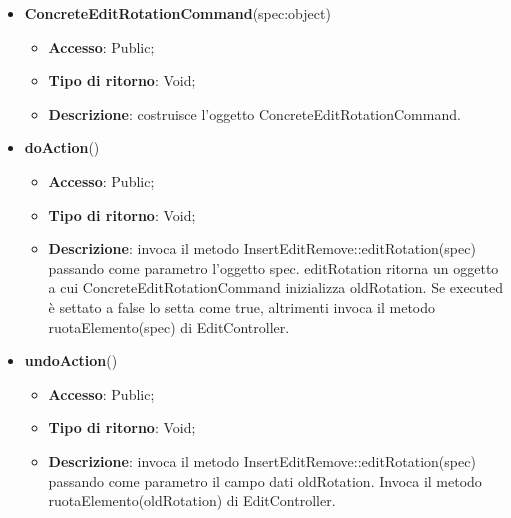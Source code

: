 {{{\begin{itemize}
\begin{itemize}
\begin{itemize}
\begin{itemize}
			\end{itemize}
		\end{itemize}
			\end{itemize}
			\end{itemize}
		\begin{itemize}
			\item \textbf{ConcreteEditRotationCommand}(spec:object)
			\begin{itemize}
				\item \textbf{Accesso}: Public;
				\item \textbf{Tipo di ritorno}: Void;
				\item \textbf{Descrizione}: costruisce l’oggetto ConcreteEditRotationCommand.
			\end{itemize}
			\item \textbf{doAction}()
			\begin{itemize}
				\item \textbf{Accesso}: Public;
				\item \textbf{Tipo di ritorno}: Void;
				\item \textbf{Descrizione}: invoca il metodo InsertEditRemove::editRotation(spec) passando come parametro l'oggetto spec. editRotation ritorna un oggetto a cui ConcreteEditRotationCommand inizializza oldRotation. Se executed è settato a false lo setta come true, altrimenti invoca il metodo ruotaElemento(spec) di EditController.
			\end{itemize}
			\item \textbf{undoAction}()
			\begin{itemize}
				\item \textbf{Accesso}: Public;
				\item \textbf{Tipo di ritorno}: Void;
				\item \textbf{Descrizione}: invoca il metodo InsertEditRemove::editRotation(spec) passando come parametro il campo dati oldRotation. Invoca il metodo ruotaElemento(oldRotation) di EditController.
			\end{itemize}
		\end{itemize}
		}

}}
